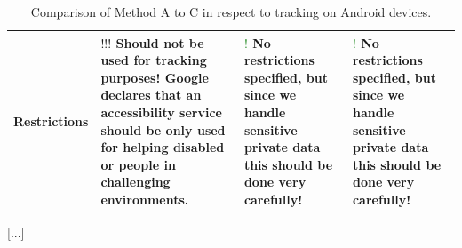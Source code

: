 \begin{table}
\begin{tabularx}{\textwidth + 5pt}{| @{\hspace{3pt}} c || @{\hspace{3pt}} M | @{\hspace{3pt}} M | @{\hspace{3pt}} M|}
		\\
		\hline
		Restrictions & 
		\textcolor{BrickRed}{\fontsize{12pt}{13pt}\boldmath$!!!$} Should not be used for tracking purposes! Google declares that an accessibility service should be only used for helping disabled or people in challenging environments. &
		\textcolor{ForestGreen}{\fontsize{12pt}{13pt}\boldmath$!$} No restrictions specified, but since we handle sensitive private data this should be done very carefully! &
		\textcolor{ForestGreen}{\fontsize{12pt}{13pt}\boldmath$!$} No restrictions specified, but since we handle sensitive private data this should be done very carefully!
		\\
		\hline 
	\end{tabularx}
	\caption{Comparison of Method A to C in respect to tracking on Android devices.}
	\label{table:comparison-method-a-b-c}
\end{table}
\restoregeometry

[...]

